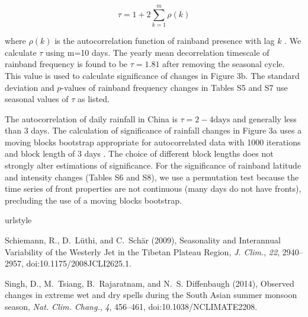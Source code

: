 \documentclass[draft,grl]{agutexSI}
\begin{document}
\begin{article}
\begin{equation*}
\tau=1+2\sum_{k=1}^m \rho(k)
\end{equation*}

where $\rho(k)$ is the autocorrelation function of rainband presence with lag $k$ \citep{VonStorch1999}. We calculate $\tau$ using m=10 days. The yearly mean decorrelation timescale of rainband frequency is found to be $\tau = 1.81$ after removing the seasonal cycle. This value is used to calculate significance of changes in Figure 3b. The standard deviation and $p$-values of rainband frequency changes in Tables S5 and S7 use seasonal values of $\tau$ as listed.

The autocorrelation of daily rainfall in China is $\tau =2-4 \mathrm{days}$ and generally less than 3 days. The calculation of significance of rainfall changes in Figure 3a uses a moving blocks bootstrap appropriate for autocorrelated data with 1000 iterations and block length of 3 days \citep{Singh2014}. The choice of different block lengths does not strongly alter estimations of significance. For the significance of rainband latitude and intensity changes (Tables S6 and S8), we use a permutation test because the time series of front properties are not continuous (many days do not have fronts), precluding the use of a moving blocks bootstrap.

\vspace{5mm}



%
%

\begin{thebibliography}{4}
\providecommand{\natexlab}[1]{#1}
\expandafter\ifx\csname urlstyle\endcsname\relax
  \providecommand{\doi}[1]{doi:\discretionary{}{}{}#1}\else
  \providecommand{\doi}{doi:\discretionary{}{}{}\begingroup
  \urlstyle{rm}\Url}\fi

Schiemann, R., D.~L\"{u}thi, and C.~Sch\"{a}r (2009), {Seasonality and
  Interannual Variability of the Westerly Jet in the Tibetan Plateau Region},
  \textit{J. Clim.}, \textit{22}, 2940--2957, \doi{10.1175/2008JCLI2625.1}.

Singh, D., M.~Tsiang, B.~Rajaratnam, and N.~S. Diffenbaugh (2014), {Observed
  changes in extreme wet and dry spells during the South Asian summer monsoon
  season}, \textit{Nat. Clim. Chang.}, \textit{4}, 456--461,
  \doi{10.1038/NCLIMATE2208}.


\end{thebibliography}
\end{article}
\end{document}
